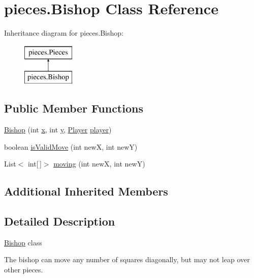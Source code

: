 \hypertarget{classpieces_1_1_bishop}{}\section{pieces.\+Bishop Class Reference}
\label{classpieces_1_1_bishop}
Inheritance diagram for pieces.\+Bishop\+:\begin{figure}[H]
\begin{center}
\leavevmode
\includegraphics[height=2.000000cm]{classpieces_1_1_bishop}
\end{center}
\end{figure}
\subsection*{Public Member Functions}
\begin{DoxyCompactItemize}
\item 
\mbox{\hyperlink{classpieces_1_1_bishop_ac957b1b3befde750ebd7b8789a4e597f}{Bishop}} (int \mbox{\hyperlink{classpieces_1_1_pieces_ac5178f9b8a6b0c4235851475081249f3}{x}}, int \mbox{\hyperlink{classpieces_1_1_pieces_a66d911734967a8ced1b9792fe900fadb}{y}}, \mbox{\hyperlink{classgame_1_1_player}{Player}} \mbox{\hyperlink{classpieces_1_1_pieces_a49f35044dd36e5c4b04261a8ea54ad0c}{player}})
\item 
boolean \mbox{\hyperlink{classpieces_1_1_bishop_a183c86371bda01aa8567b245a4977dab}{is\+Valid\+Move}} (int newX, int newY)
\item 
List$<$ int\mbox{[}$\,$\mbox{]}$>$ \mbox{\hyperlink{classpieces_1_1_bishop_a3bdcfb9a3b44569aee1d5d4e5aa7333d}{moving}} (int newX, int newY)
\end{DoxyCompactItemize}
\subsection*{Additional Inherited Members}


\subsection{Detailed Description}
\mbox{\hyperlink{classpieces_1_1_bishop}{Bishop}} class 

The bishop can move any number of squares diagonally, but may not leap over other pieces. 

